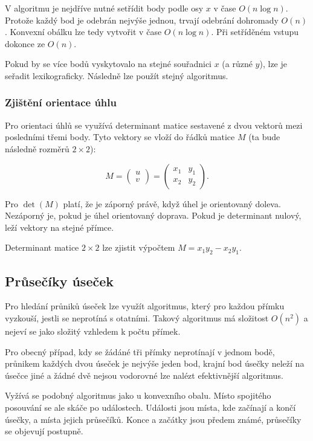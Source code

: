 V algoritmu je nejdříve nutné setřídit body podle osy $x$ v čase $O(n \log{n})$.
Protože každý bod je odebrán nejvýše jednou, trvají odebrání dohromady $O(n)$.
Konvexní obálku lze tedy vytvořit v čase $O(n \log{n})$.
Při setříděném vstupu dokonce ze $O(n)$.

Pokud by se více bodů vyskytovalo na stejné souřadnici $x$ (a různé $y$), lze je seřadit lexikograficky.
Následně lze použít stejný algoritmus.

\subsubsection{Zjištění orientace úhlu}

Pro orientaci úhlů se využívá determinant matice sestavené z dvou vektorů mezi posledními třemi body.
Tyto vektory se vloží do řádků matice $M$ (ta bude následně rozměrů $2 \times 2$):

\[
    M
    =
    \begin{pmatrix} u \\ v \end{pmatrix}
    =
    \begin{pmatrix}
     x_1 & y_1 \\
     x_2 & y_2
    \end{pmatrix}.
\]

Pro $\det (M)$ platí, že je záporný právě, když úhel je orientovaný doleva.
Nezáporný je, pokud je úhel orientovaný doprava.
Pokud je determinant nulový, leží vektory na stejné přímce.

Determinant matice $2 \times 2$ lze zjistit výpočtem $M = x_1y_2 - x_2y_1$.

\subsection{Průsečíky úseček}\label{alg:pruseciky-usecek}

Pro hledání průniků úseček lze využít algoritmus, který pro každou přímku vyzkouší, jestli se neprotíná s otatními.
Takový algoritmus má složitost $O(n^2)$ a nejeví se jako složitý vzhledem k počtu přímek.

Pro obecný případ, kdy se žádáné tři přímky neprotínají v jednom bodě, průnikem každých dvou úseček je nejvýše jeden bod, krajní bod úsečky neleží na úsečce jiné a žádné dvě nejsou vodorovné lze nalézt efektivnější algoritmus.

Vyžívá se podobný algoritmus jako u konvexního obalu.
Místo spojitého posouvání se ale skáče po událostech.
Události jsou místa, kde začínají a končí úsečky, a místa jejich průsečíků.
Konce a začátky jsou předem známé, průsečíky se objevují postupně.

